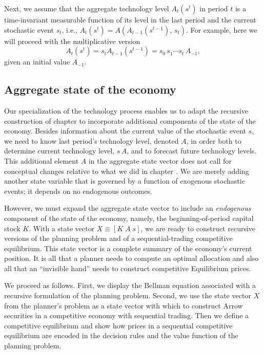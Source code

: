 Next, we assume that the aggregate technology level $A_t(s^t)$
in period $t$ is a time-invariant measurable function of its
level in the last period and the current stochastic event $s_t$,
i.e., $A_t(s^t) = A\left( A_{t-1}(s^{t-1}),\, s_t\right)$. For
example, here we will proceed with the multiplicative version
$$
A_t(s^t) = s_t A_{t-1}(s^{t-1}) =  s_0 \,s_1 \cdots s_t \, A_{-1},
$$
given an initial value $A_{-1}$.






\subsection{Aggregate state of the economy}
Our specialization of the technology process enables us to
adapt the recursive construction of chapter  to incorporate
additional components of the state of the economy. Besides information
about the current value of the stochastic event $s$, we need to know
last period's technology level, denoted $A$, in order both to determine
current technology level, $s\,A$, and to forecast future technology
levels. This additional element $A$ in the aggregate state vector
does not call for  conceptual changes relative to  what we did in
chapter . We are merely adding another state
variable that is governed by a function of exogenous stochastic events;
it  depends on  no endogenous outcomes.


However,  we must expand the aggregate state vector to include 
an {\it endogenous\/} component of the state of the economy, namely, the
beginning-of-period capital stock $K$. With a state
vector $X\equiv \left[ K \;  A \; s\right]$, we are ready to construct
 recursive versions of the planning problem
and of a sequential-trading competitive equilibrium. This state vector is
a complete summary of the economy's current position. It is
all that  a planner needs to compute an optimal
allocation and also  all that  an ``invisible hand'' needs
to construct competitive Equilibrium prices.


We proceed as follows. First, we display the Bellman equation
associated with a recursive formulation of the planning problem.  Second, we
use the
 state vector $X$
from the planner's problem as a state vector
with which to construct  Arrow securities in a competitive economy with sequential
trading.    Then we define a competitive equilibrium
and show how  prices in a  sequential competitive equilibrium are encoded in
the decision rules and the value function of the planning problem.




